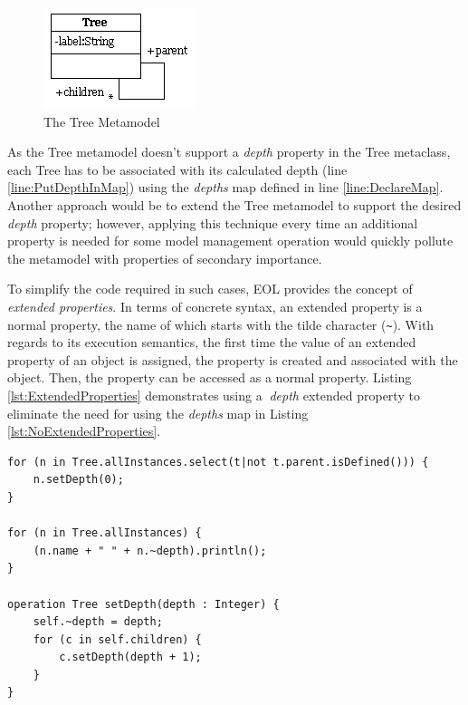 \begin{figure}[t!]
	\centering
		\includegraphics{images/metamodels/Tree.png}
	\caption{The Tree Metamodel}
	\label{fig:Tree1}
\end{figure}

As the Tree metamodel doesn't support a \emph{depth} property in the Tree metaclass, each Tree has to be associated with its calculated depth (line \ref{line:PutDepthInMap}) using the \emph{depths} map defined in line \ref{line:DeclareMap}. Another approach would be to extend the Tree metamodel to support the desired \emph{depth} property; however, applying this technique every time an additional property is needed for some model management operation would quickly pollute the metamodel with properties of secondary importance.

To simplify the code required in such cases, EOL provides the concept of \emph{extended properties}. In terms of concrete syntax, an extended property is a normal property, the name of which starts with the tilde character (\verb|~|). With regards to its execution semantics, the first time the value of an extended property of an object is assigned, the property is created and associated with the object. Then, the property can be accessed as a normal property. Listing \ref{lst:ExtendedProperties} demonstrates using a $~$\emph{depth} extended property to eliminate the need for using the \emph{depths} map in Listing \ref{lst:NoExtendedProperties}.

\begin{lstlisting}[basicstyle=\ttfamily\footnotesize, flexiblecolumns=true, numbers=none, nolol=true, caption=A simplified version of Listing \ref{lst:NoExtendedProperties} using extended properties, label=lst:ExtendedProperties, numbers=left, language=EOL, tabsize=2]
for (n in Tree.allInstances.select(t|not t.parent.isDefined())) {
	n.setDepth(0);
}

for (n in Tree.allInstances) {
	(n.name + " " + n.~depth).println();
}

operation Tree setDepth(depth : Integer) {
	self.~depth = depth;
	for (c in self.children) {
		c.setDepth(depth + 1);
	}
}
\end{lstlisting}

